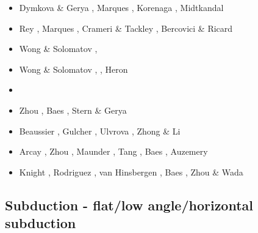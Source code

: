 \begin{scriptsize}
\begin{itemize}
\item[\twothousandthirteen] Dymkova \& Gerya \cite{dyge13}, Marques \etal \cite{mana13},
                      Korenaga \cite{kore13}, Midtkandal \etal \cite{mibg13}
\item[\twothousandfourteen] Rey \etal \cite{recf14}, Marques \etal \cite{macg14},
                      Crameri \& Tackley \cite{crta14}, Bercovici \& Ricard \cite{beri14}
\item[\twothousandfifteen] Wong \& Solomatov \cite{woso15}, \cite{matv15}
                           \cite{pebu15}\cite{vapm15}\cite{legu15}\cite{gesb15}
\item[\twothousandsixteen] Wong \& Solomatov \cite{woso16a}, \cite{crta16}
                           \cite{maka16}\cite{bags16}, Heron \etal \cite{heps16}
\item[\twothousandseventeen] \cite{magm17}
\item[\twothousandeighteen] Zhou \etal \cite{zhlg18}, Baes \etal \cite{basq18}, Stern \& Gerya \cite{stge18} 
\item[\twothousandnineteen] Beaussier \etal \cite{begb19}, Gulcher \etal \cite{gubg19}, 
                            Ulvrova \etal \cite{ulcw19}, Zhong \& Li \cite{zhli19}
\item[\twothousandtwenty] Arcay \etal \cite{arla20}, Zhou \etal \cite{zhlg20}, 
                          Maunder \etal \cite{mapg20}, Tang \etal \cite{tawm20}, 
                          Baes \etal \cite{basg20b}, Auzemery \etal \cite{auwy20}
\item[\twothousandtwentyone] Knight \etal \cite{kndc21}, Rodriguez \etal \cite{roac21},
                             van Hinsbergen \etal \cite{vasg21}, Baes \etal \cite{basg21},
                             Zhou \& Wada \cite{zhwa21}
\end{itemize}
\end{scriptsize}

\subsection{Subduction - flat/low angle/horizontal subduction}

